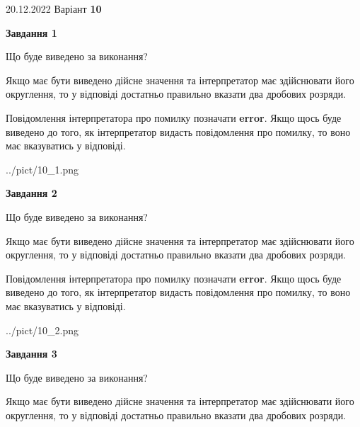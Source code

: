 \documentclass[12pt, ukrainian]{article}
\begin{document}
{20.12.2022 Варіант \No \textbf { 10 }\par}
{
\begin {Large}

{\begin {center}\textbf{Завдання 1}\end {center}}\par
Що буде виведено за виконання? \par

Якщо має бути виведено дійсне значення та інтерпретатор має здійснювати його округлення, 
то у відповіді достатньо правильно вказати два дробових розряди.

Повідомлення інтерпретатора про помилку позначати \textbf{error}.
Якщо щось буде виведено до того, як інтерпретатор видасть повідомлення про помилку, 
то воно має вказуватись у відповіді. \par

\begin{center}
	{../pict/10_1.png}
\end{center}
\newpage

{\begin {center}\textbf{Завдання 2}\end {center}}\par
Що буде виведено за виконання? \par

Якщо має бути виведено дійсне значення та інтерпретатор має здійснювати його округлення, 
то у відповіді достатньо правильно вказати два дробових розряди.

Повідомлення інтерпретатора про помилку позначати \textbf{error}.
Якщо щось буде виведено до того, як інтерпретатор видасть повідомлення про помилку, 
то воно має вказуватись у відповіді. \par

\begin{center}
	{../pict/10_2.png}
\end{center}
\newpage

{\begin {center}\textbf{Завдання 3}\end {center}}\par
Що буде виведено за виконання? \par

Якщо має бути виведено дійсне значення та інтерпретатор має здійснювати його округлення, 
то у відповіді достатньо правильно вказати два дробових розряди.


\end{Large}}
\end{document}
